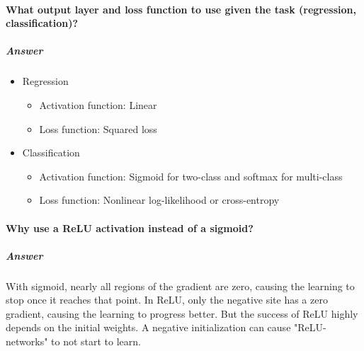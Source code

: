 \documentclass[a4paper, 11pt, accentcolor = tud3b]{tudreport}
\newcommand{\answer}[1]{\subparagraph{Answer} #1}
\begin{document}
			\paragraph{What output layer and loss function to use given the task (regression, classification)?}
			\answer{
				\begin{itemize}
					\item Regression
						\begin{itemize}
							\item Activation function: Linear
							\item Loss function: Squared loss
						\end{itemize}
					\item Classification
						\begin{itemize}
							\item Activation function: Sigmoid for two-class and softmax for multi-class
							\item Loss function: Nonlinear log-likelihood or cross-entropy
						\end{itemize}
				\end{itemize}
			}

			\paragraph{Why use a ReLU activation instead of a sigmoid?}
			\answer{With sigmoid, nearly all regions of the gradient are zero, causing the learning to stop once it reaches that point. In ReLU, only the negative site has a zero gradient, causing the learning to progress better. But the success of ReLU highly depends on the initial weights. A negative initialization can cause "ReLU-networks" to not start to learn.}
\end{document}
